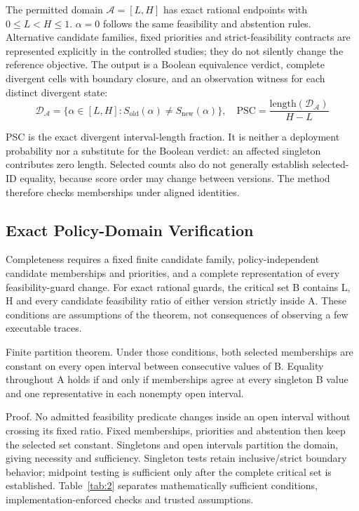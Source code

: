 \documentclass[11pt,a4paper]{article}
\begin{document}
The permitted domain $\mathcal{A} = [L, H]$ has exact rational endpoints with $0 \le L < H \le 1$. $\alpha = 0$ follows the same feasibility and abstention rules. Alternative candidate families, fixed priorities and strict-feasibility contracts are represented explicitly in the controlled studies; they do not silently change the reference objective. The output is a Boolean equivalence verdict, complete divergent cells with boundary closure, and an observation witness for each distinct divergent state:
\begin{equation}
\mathcal{D}_{\mathcal{A}} = \{\alpha \in [L, H] : S_{\mathrm{old}}(\alpha) \neq S_{\mathrm{new}}(\alpha)\}, \quad \mathrm{PSC} = \frac{\mathrm{length}(\mathcal{D}_{\mathcal{A}})}{H - L} \label{eq:psc}
\end{equation}

PSC is the exact divergent interval-length fraction. It is neither a deployment probability nor a substitute for the Boolean verdict: an affected singleton contributes zero length. Selected counts also do not generally establish selected-ID equality, because score order may change between versions. The method therefore checks memberships under aligned identities.


\subsection{Exact Policy-Domain Verification}\label{subsec:spec}

Completeness requires a fixed finite candidate family, policy-independent candidate memberships and priorities, and a complete representation of every feasibility-guard change. For exact rational guards, the critical set B contains L, H and every candidate feasibility ratio of either version strictly inside A. These conditions are assumptions of the theorem, not consequences of observing a few executable traces.

Finite partition theorem. Under those conditions, both selected memberships are constant on every open interval between consecutive values of B. Equality throughout A holds if and only if memberships agree at every singleton B value and one representative in each nonempty open interval.

Proof. No admitted feasibility predicate changes inside an open interval without crossing its fixed ratio. Fixed memberships, priorities and abstention then keep the selected set constant. Singletons and open intervals partition the domain, giving necessity and sufficiency. Singleton tests retain inclusive/strict boundary behavior; midpoint testing is sufficient only after the complete critical set is established. Table~\ref{tab:2} separates mathematically sufficient conditions, implementation-enforced checks and trusted assumptions.
\end{document}
